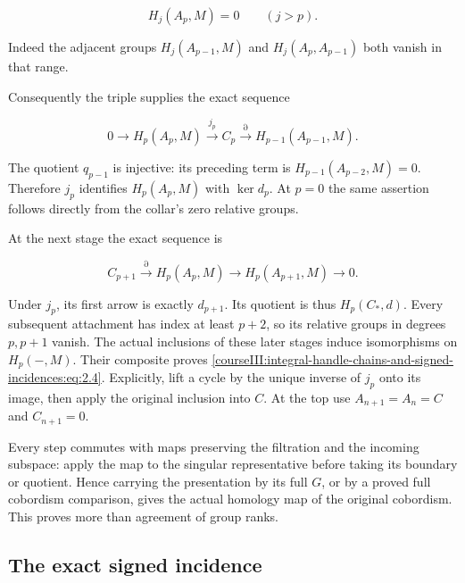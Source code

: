 \begin{equation}
H_j(A_p,M)=0\qquad(j>p).
 \label{courseIII:integral-handle-chains-and-signed-incidences:eq:2.5}
\end{equation}

Indeed the adjacent groups \(H_j(A_{p-1},M)\) and \(H_j(A_p,A_{p-1})\) both vanish in that range.

Consequently the triple supplies the exact sequence

\begin{equation}
0\longrightarrow H_p(A_p,M)
 \xrightarrow{j_p}C_p
 \xrightarrow{\partial}H_{p-1}(A_{p-1},M).
 \label{courseIII:integral-handle-chains-and-signed-incidences:eq:2.6}
\end{equation}

The quotient \(q_{p-1}\) is injective: its preceding term is \(H_{p-1}(A_{p-2},M)=0\). Therefore \(j_p\) identifies \(H_p(A_p,M)\) with \(\ker d_p\). At \(p=0\) the same assertion follows directly from the collar's zero relative groups.

At the next stage the exact sequence is

\begin{equation}
C_{p+1}\xrightarrow{\partial}H_p(A_p,M)
 \longrightarrow H_p(A_{p+1},M)\longrightarrow0.
 \label{courseIII:integral-handle-chains-and-signed-incidences:eq:2.7}
\end{equation}

Under \(j_p\), its first arrow is exactly \(d_{p+1}\). Its quotient is thus \(H_p(C_*,d)\). Every subsequent attachment has index at least \(p+2\), so its relative groups in degrees \(p,p+1\) vanish. The actual inclusions of these later stages induce isomorphisms on \(H_p(-,M)\). Their composite proves \eqref{courseIII:integral-handle-chains-and-signed-incidences:eq:2.4}. Explicitly, lift a cycle by the unique inverse of \(j_p\) onto its image, then apply the original inclusion into \(C\). At the top use \(A_{n+1}=A_n=C\) and \(C_{n+1}=0\).

Every step commutes with maps preserving the filtration and the incoming subspace: apply the map to the singular representative before taking its boundary or quotient. Hence carrying the presentation by its full \(G\), or by a proved full cobordism comparison, gives the actual homology map of the original cobordism. This proves more than agreement of group ranks.

\subsection{The exact signed incidence}
\label{courseIII:integral-handle-chains-and-signed-incidences:handle-signed-incidence}


